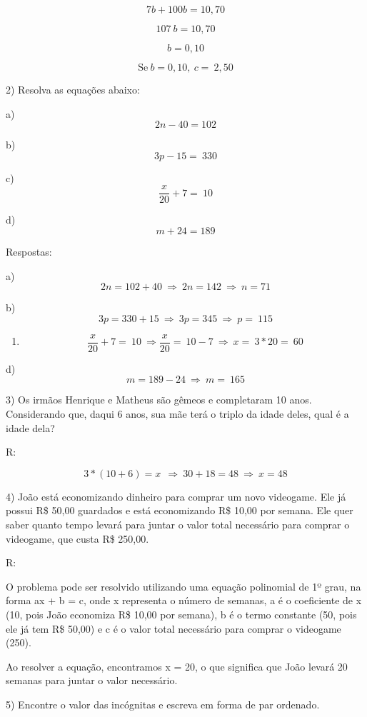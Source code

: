 \[7b + 100b = 10,70\]

\[107\ b = 10,70\]

\[b = 0,10\]

\[\text{Se}\ b = 0,10,\ c = \ 2,50\]

2) Resolva as equações abaixo:

a) \[2n - 40 = 102\]

b) \[3p - 15 = \ 330\]

c) \[\frac{x}{20} + 7 = \ 10\]

d) \[m + 24 = 189\]

Respostas:

a) \[2n = 102 + 40\  \Rightarrow \ 2n = 142\  \Rightarrow \ n = 71\]

b) \[3p = 330 + 15\  \Rightarrow \ 3p = 345\  \Rightarrow \ p = \ 115\]

\begin{enumerate}
\def\labelenumi{\alph{enumi})}
\setcounter{enumi}{2}
\tightlist
\item
  \[\ \frac{x}{20} + 7 = \ 10\  \Rightarrow \frac{x}{20} = \ 10 - 7\  \Rightarrow \ x = \ 3*20 = \ 60\]
\end{enumerate}

d) \[m = 189 - 24\  \Rightarrow \ m = \ 165\]

3) Os irmãos Henrique e Matheus são gêmeos e completaram 10 anos.
Considerando que, daqui 6 anos, sua mãe terá o triplo da idade deles,
qual é a idade dela?

R:

\[3*(10 + 6) = x\ \  \Rightarrow \ 30 + 18 = 48\  \Rightarrow \ x = 48\]

4) João está economizando dinheiro para comprar um novo videogame. Ele
já possui R\$ 50,00 guardados e está economizando R\$ 10,00 por semana.
Ele quer saber quanto tempo levará para juntar o valor total necessário
para comprar o videogame, que custa R\$ 250,00.

R:

O problema pode ser resolvido utilizando uma equação polinomial de 1º
grau, na forma ax + b = c, onde x representa o número de semanas, a é o
coeficiente de x (10, pois João economiza R\$ 10,00 por semana), b é o
termo constante (50, pois ele já tem R\$ 50,00) e c é o valor total
necessário para comprar o videogame (250).

Ao resolver a equação, encontramos x = 20, o que significa que João
levará 20 semanas para juntar o valor necessário.

5) Encontre o valor das incógnitas e escreva em forma de par ordenado.

